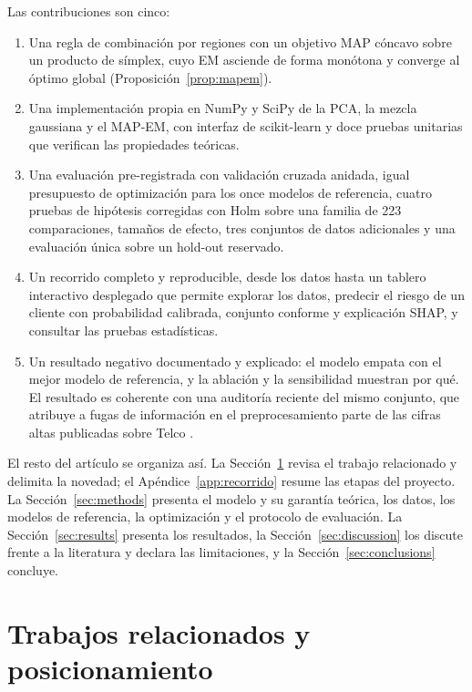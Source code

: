 \documentclass[11pt,a4paper]{article}
\begin{document}
Las contribuciones son cinco:
\begin{enumerate}
\item Una regla de combinación por regiones con un objetivo MAP cóncavo sobre un producto de símplex, cuyo EM asciende de forma monótona y converge al óptimo global (Proposición~\ref{prop:mapem}).
\item Una implementación propia en NumPy y SciPy de la PCA, la mezcla gaussiana y el MAP-EM, con interfaz de scikit-learn y doce pruebas unitarias que verifican las propiedades teóricas.
\item Una evaluación pre-registrada con validación cruzada anidada, igual presupuesto de optimización para los once modelos de referencia, cuatro pruebas de hipótesis corregidas con Holm sobre una familia de 223 comparaciones, tamaños de efecto, tres conjuntos de datos adicionales y una evaluación única sobre un hold-out reservado.
\item Un recorrido completo y reproducible, desde los datos hasta un tablero interactivo desplegado que permite explorar los datos, predecir el riesgo de un cliente con probabilidad calibrada, conjunto conforme y explicación SHAP, y consultar las pruebas estadísticas.
\item Un resultado negativo documentado y explicado: el modelo empata con el mejor modelo de referencia, y la ablación y la sensibilidad muestran por qué. El resultado es coherente con una auditoría reciente del mismo conjunto, que atribuye a fugas de información en el preprocesamiento parte de las cifras altas publicadas sobre Telco \cite{roy2026}.
\end{enumerate}

El resto del artículo se organiza así. La Sección~\ref{sec:related} revisa el trabajo relacionado y delimita la novedad; el Apéndice~\ref{app:recorrido} resume las etapas del proyecto. La Sección~\ref{sec:methods} presenta el modelo y su garantía teórica, los datos, los modelos de referencia, la optimización y el protocolo de evaluación. La Sección~\ref{sec:results} presenta los resultados, la Sección~\ref{sec:discussion} los discute frente a la literatura y declara las limitaciones, y la Sección~\ref{sec:conclusions} concluye.

\section{Trabajos relacionados y posicionamiento}\label{sec:related}
\end{document}
